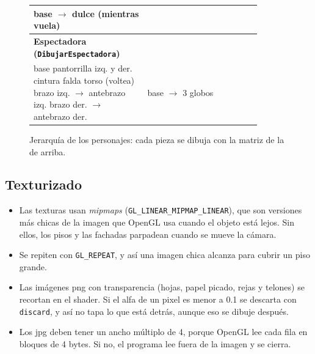 \documentclass[11pt,a4paper]{article}
\begin{document}
\begin{figure}[H]
\begin{tabular}{|p{0.44\linewidth}|p{0.44\linewidth}|}
    \parbox[t]{\linewidth}{\ttfamily
      base \(\rightarrow\) dulce (mientras vuela)\vspace{2pt}} \\ \hline
    \textbf{Espectadora (\texttt{DibujarEspectadora})} & \\ \hline
    \parbox[t]{\linewidth}{\ttfamily
      base\\
      \hspace*{1em}pantorrilla izq. y der.\\
      \hspace*{1em}cintura\\
      \hspace*{2em}falda\\
      \hspace*{2em}torso (voltea)\\
      \hspace*{3em}brazo izq. \(\rightarrow\) antebrazo izq.\\
      \hspace*{3em}brazo der. \(\rightarrow\) antebrazo der.\vspace{2pt}} &
    \parbox[t]{\linewidth}{\ttfamily
      base \(\rightarrow\) 3 globos\vspace{2pt}} \\ \hline
  \end{tabular}
  \caption{Jerarquía de los personajes: cada pieza se dibuja con la matriz de la de arriba.}
\end{figure}


\subsection{Texturizado}

\begin{itemize}
  \item Las texturas usan \textit{mipmaps} (\texttt{GL\_LINEAR\_MIPMAP\_LINEAR}), que son versiones más chicas de la imagen que OpenGL usa cuando el objeto está lejos. Sin ellos, los pisos y las fachadas parpadean cuando se mueve la cámara.
  \item Se repiten con \texttt{GL\_REPEAT}, y así una imagen chica alcanza para cubrir un piso grande.
  \item Las imágenes png con transparencia (hojas, papel picado, rejas y telones) se recortan en el shader. Si el alfa de un pixel es menor a 0.1 se descarta con \texttt{discard}, y así no tapa lo que está detrás, aunque eso se dibuje después.
  \item Los jpg deben tener un ancho múltiplo de 4, porque OpenGL lee cada fila en bloques de 4 bytes. Si no, el programa lee fuera de la imagen y se cierra.
\end{itemize}
\end{document}
